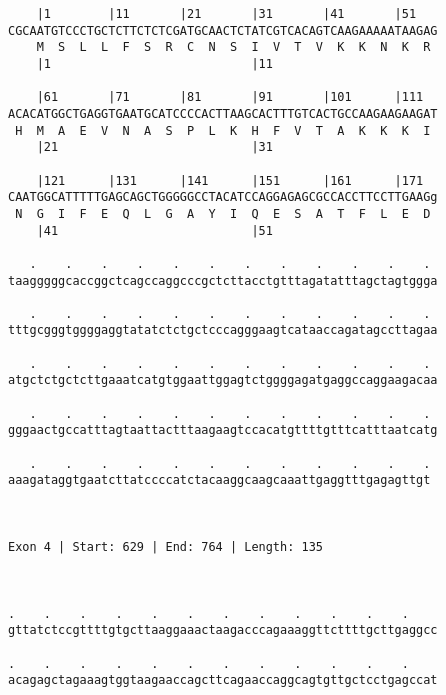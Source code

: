 \documentclass{article}
\begin{document}
\begin{Verbatim}
    |1        |11       |21       |31       |41       |51   
CGCAATGTCCCTGCTCTTCTCTCGATGCAACTCTATCGTCACAGTCAAGAAAAATAAGAG
    M  S  L  L  F  S  R  C  N  S  I  V  T  V  K  K  N  K  R 
    |1                            |11                       
  
    |61       |71       |81       |91       |101      |111  
ACACATGGCTGAGGTGAATGCATCCCCACTTAAGCACTTTGTCACTGCCAAGAAGAAGAT
 H  M  A  E  V  N  A  S  P  L  K  H  F  V  T  A  K  K  K  I 
    |21                           |31                       
  
    |121      |131      |141      |151      |161      |171  
CAATGGCATTTTTGAGCAGCTGGGGGCCTACATCCAGGAGAGCGCCACCTTCCTTGAAGg
 N  G  I  F  E  Q  L  G  A  Y  I  Q  E  S  A  T  F  L  E  D 
    |41                           |51                       
  
   .    .    .    .    .    .    .    .    .    .    .    . 
taagggggcaccggctcagccaggcccgctcttacctgtttagatatttagctagtggga
                                                            
   .    .    .    .    .    .    .    .    .    .    .    . 
tttgcgggtggggaggtatatctctgctcccagggaagtcataaccagatagccttagaa
                                                            
   .    .    .    .    .    .    .    .    .    .    .    . 
atgctctgctcttgaaatcatgtggaattggagtctggggagatgaggccaggaagacaa
                                                            
   .    .    .    .    .    .    .    .    .    .    .    . 
gggaactgccatttagtaattactttaagaagtccacatgttttgtttcatttaatcatg
                                                            
   .    .    .    .    .    .    .    .    .    .    .    .
aaagataggtgaatcttatccccatctacaaggcaagcaaattgaggtttgagagttgt
                                                           
                                                           
 
Exon 4 | Start: 629 | End: 764 | Length: 135



.    .    .    .    .    .    .    .    .    .    .    .    
gttatctccgttttgtgcttaaggaaactaagacccagaaaggttcttttgcttgaggcc
                                                            
.    .    .    .    .    .    .    .    .    .    .    .    
acagagctagaaagtggtaagaaccagcttcagaaccaggcagtgttgctcctgagccat
                                                            

\end{Verbatim}
\end{document}
